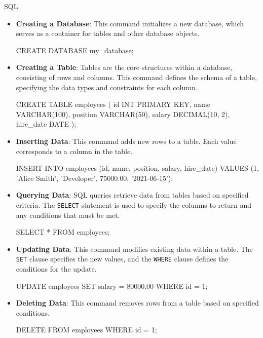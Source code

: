 \begin{notes}{SQL}
\begin{highlight}
        \begin{itemize}
            \item \textbf{Creating a Database}: This command initializes a new database, which serves as a container for tables and other database objects.
    \begin{code}[SQL]
    CREATE DATABASE my_database;
    \end{code}
            \item \textbf{Creating a Table}: Tables are the core structures within a database, consisting of rows and columns. This command defines the schema of a table, specifying the data types and constraints for each column.
    \begin{code}[SQL]
    CREATE TABLE employees (
        id INT PRIMARY KEY,
        name VARCHAR(100),
        position VARCHAR(50),
        salary DECIMAL(10, 2),
        hire_date DATE
    );
    \end{code}
            \item \textbf{Inserting Data}: This command adds new rows to a table. Each value corresponds to a column in the table.
    \begin{code}[SQL]
    INSERT INTO employees (id, name, position, salary, hire_date)
    VALUES (1, 'Alice Smith', 'Developer', 75000.00, '2021-06-15');
    \end{code}
            \item \textbf{Querying Data}: SQL queries retrieve data from tables based on specified criteria. The \texttt{SELECT} statement is used to specify the columns to return and any conditions that must be met.
    \begin{code}[SQL]
    SELECT * FROM employees;
    \end{code}
            \item \textbf{Updating Data}: This command modifies existing data within a table. The \texttt{SET} clause specifies the new values, and the \texttt{WHERE} clause defines the conditions for the update.
    \begin{code}[SQL]
    UPDATE employees
    SET salary = 80000.00
    WHERE id = 1;
    \end{code}
            \item \textbf{Deleting Data}: This command removes rows from a table based on specified conditions.
    \begin{code}[SQL]
    DELETE FROM employees
    WHERE id = 1;
    \end{code}
        \end{itemize}
    

\end{highlight}
\end{notes}
